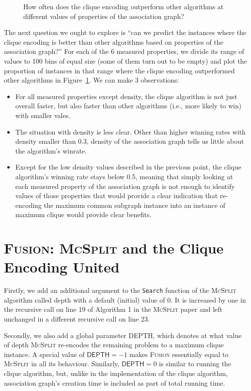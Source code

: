 \documentclass{l4proj}
\theoremstyle{definition}
\theoremstyle{remark}
\begin{document}
\begin{figure}
\begin{subfigure}[t]{0.49\textwidth}
  \end{subfigure}
  \caption{How often does the clique encoding outperform other algorithms at
    different values of properties of the association graph?}
  \label{fig:bins}
\end{figure}

The next question we ought to explore is ``can we predict the instances where
the clique encoding is better than other algorithms based on properties of the
association graph?'' For each of the 6 measured properties, we divide its range
of values to 100 bins of equal size (some of them turn out to be empty) and plot
the proportion of instances in that range where the clique encoding outperformed
other algorithms in Figure~\ref{fig:bins}. We can make 3 observations:
\begin{itemize}
\item For all measured properties except density, the clique algorithm is not
  just overall faster, but also faster than other algorithms (i.e., more likely
  to win) with smaller vales.
\item The situation with density is less clear. Other than higher winning rates
  with density smaller than 0.3, density of the association graph tells us
  little about the algorithm's winrate.
\item Except for the low density values described in the previous point, the
  clique algorithm's winning rate stays below 0.5, meaning that simply looking
  at each measured property of the association graph is not enough to identify
  values of those properties that would provide a clear indication that
  re-encoding the maximum common subgraph instance into an instance of maximum
  clique would provide clear benefits.
\end{itemize}

\section{\textsc{Fusion}: \textsc{McSplit} and the Clique Encoding United}

Firstly, we add an additional argument to the \texttt{Search} function of the
\textsc{McSplit} algorithm \cite{DBLP:conf/ijcai/McCreeshPT17} called
\textsf{depth} with a default (initial) value of 0. It is increased by one in
the recursive call on line 19 of Algorithm 1 in the \textsc{McSplit} paper and
left unchanged in a different recursive call on line 23.

Secondly, we also add a global parameter \textsf{DEPTH}, which denotes at what value of
\textsf{depth} \textsc{McSplit} re-encodes the remaining problem to a maximum
clique instance. A special value of $\textsf{DEPTH} = -1$ makes \textsc{Fusion}
essentially equal to \textsc{McSplit} in all its behaviour. Similarly,
$\textsf{DEPTH} = 0$ is similar to running the clique algorithm, but, unlike in
the implementation of the clique algorithm, association graph's creation time is
included as part of total running time.
\end{document}
